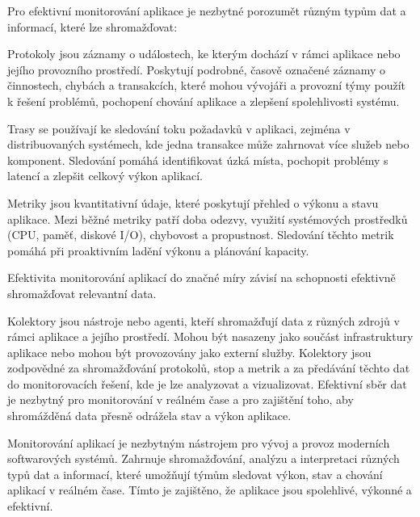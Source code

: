 
Pro efektivní monitorování aplikace je nezbytné porozumět různým typům dat a informací, které lze shromažďovat:


Protokoly jsou záznamy o událostech, ke kterým dochází v rámci aplikace nebo jejího provozního prostředí. Poskytují podrobné, časově označené záznamy o činnostech, chybách a transakcích, které mohou vývojáři a provozní týmy použít k řešení problémů, pochopení chování aplikace a zlepšení spolehlivosti systému.


Trasy se používají ke sledování toku požadavků v aplikaci, zejména v distribuovaných systémech, kde jedna transakce může zahrnovat více služeb nebo komponent. Sledování pomáhá identifikovat úzká místa, pochopit problémy s latencí a zlepšit celkový výkon aplikací.


Metriky jsou kvantitativní údaje, které poskytují přehled o výkonu a stavu aplikace. Mezi běžné metriky patří doba odezvy, využití systémových prostředků (CPU, paměť, diskové I/O), chybovost a propustnost. Sledování těchto metrik pomáhá při proaktivním ladění výkonu a plánování kapacity.



Efektivita monitorování aplikací do značné míry závisí na schopnosti efektivně shromažďovat relevantní data.


Kolektory jsou nástroje nebo agenti, kteří shromažďují data z různých zdrojů v rámci aplikace a jejího prostředí. Mohou být nasazeny jako součást infrastruktury aplikace nebo mohou být provozovány jako externí služby. Kolektory jsou zodpovědné za shromažďování protokolů, stop a metrik a za předávání těchto dat do monitorovacích řešení, kde je lze analyzovat a vizualizovat. Efektivní sběr dat je nezbytný pro monitorování v reálném čase a pro zajištění toho, aby shromážděná data přesně odrážela stav a výkon aplikace.


Monitorování aplikací je nezbytným nástrojem pro vývoj a provoz moderních softwarových systémů. Zahrnuje shromažďování, analýzu a interpretaci různých typů dat a informací, které umožňují týmům sledovat výkon, stav a chování aplikací v reálném čase. Tímto je zajištěno, že aplikace jsou spolehlivé, výkonné a efektivní.
